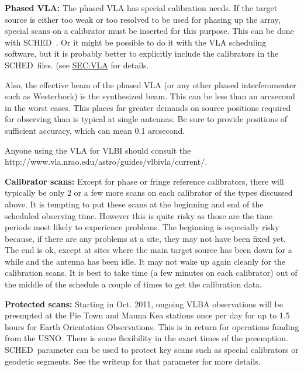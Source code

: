 \documentclass{report}
\newcommand{\schedb}{{\sc SCHED~}}
\begin{document}
\begin{list}{}{\parsep .5em  \itemsep .5em }
\item {\bf Phased VLA:} The phased VLA has special calibration needs.
If the target source is either too weak or too resolved to be used for
phasing up the array, special scans on a calibrator must be inserted
for this purpose.  This can be done with \schedb.  Or it might be
possible to do it with the VLA scheduling software, but it is probably
better to explicitly include the calibrators in the \schedb files.  
(see \hyperref{the section on VLBI at the VLA}{Section
}{}{SEC:VLA} for details.

Also, the effective beam of the phased VLA (or any other phased
interferomenter such as Westerbork) is the synthesized beam.  This
can be less than an arcsecond in the worst cases.  This places far
greater demands on source positions required for observing than
is typical at single antennas.  Be sure to provide positions
of sufficient accuracy, which can mean 0.1 arcsecond.

Anyone using the VLA for VLBI should consult the
{http://www.vla.nrao.edu/astro/guides/vlbivla/current/}.

\item{\bf Calibrator scans:} Except for phase or fringe reference
calibrators, there will typically be only 2 or a few more scans on
each calibrator of the types discussed above.  It is tempting to put
these scans at the beginning and end of the scheduled observing time.
However this is quite risky as those are the time periods most likely
to experience problems.  The beginning is especially risky because, if
there are any problems at a site, they may not have been fixed yet.
The end is ok, except at sites where the main target source has been
down for a while and the antenna has been idle.  It may not wake up
again cleanly for the calibration scans.  It is best to take time (a
few minutes on each calibrator) out of the middle of the schedule a
couple of times to get the calibration data.

\item{\bf Protected scans:} Starting in Oct. 2011, ongoing VLBA
observations will be preempted at the Pie Town and Mauna Kea stations
once per day for up to 1.5 hours for Earth Orientation Observations.
This is in return for operations funding from the USNO.  There is some
flexibility in the exact times of the preemption. \schedb parameter
 can be used to protect key scans such
as special calibrators or geodetic segments.  See the writeup for that
parameter for more details.


\end{list}
\end{document}
